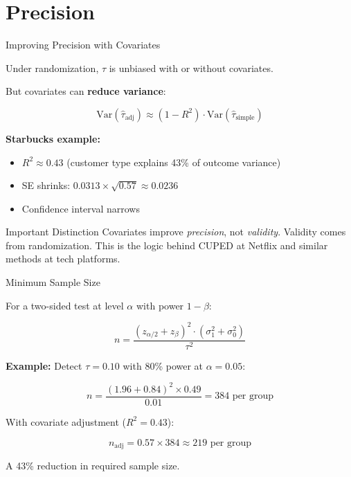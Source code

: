 \documentclass[aspectratio=169, 11pt, handout]{beamer}
\newcommand{\Var}{\mathrm{Var}}
\begin{document}
\section{Precision}

\begin{frame}{Improving Precision with Covariates}

Under randomization, $\hat{\tau}$ is unbiased with or without covariates.

But covariates can \textbf{reduce variance}:

\[
\Var(\hat{\tau}_{\text{adj}}) \approx (1 - R^2) \cdot \Var(\hat{\tau}_{\text{simple}})
\]

\pause
\bigskip

\textbf{Starbucks example:}

\begin{itemize}
    \item $R^2 \approx 0.43$ (customer type explains 43\% of outcome variance)
    \item SE shrinks: $0.0313 \times \sqrt{0.57} \approx 0.0236$
    \item Confidence interval narrows
\end{itemize}

\bigskip

\begin{alertblock}{Important Distinction}
Covariates improve \emph{precision}, not \emph{validity}. Validity comes from randomization. This is the logic behind CUPED at Netflix and similar methods at tech platforms.
\end{alertblock}
\end{frame}

\begin{frame}{Minimum Sample Size}

For a two-sided test at level $\alpha$ with power $1 - \beta$:

\[
n = \frac{(z_{\alpha/2} + z_\beta)^2 \cdot (\sigma_1^2 + \sigma_0^2)}{\tau^2}
\]

\bigskip

\textbf{Example:} Detect $\tau = 0.10$ with 80\% power at $\alpha = 0.05$:

\[
n = \frac{(1.96 + 0.84)^2 \times 0.49}{0.01} = 384 \text{ per group}
\]

\bigskip

With covariate adjustment ($R^2 = 0.43$):

\[
n_{\text{adj}} = 0.57 \times 384 \approx 219 \text{ per group}
\]

A 43\% reduction in required sample size.
\end{frame}
\end{document}
